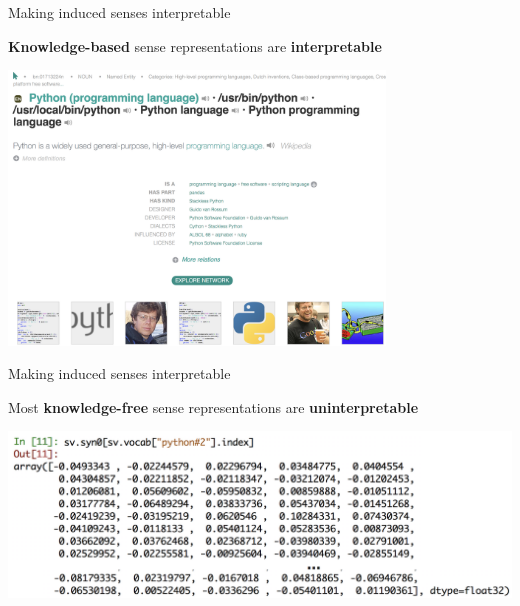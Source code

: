 \documentclass[usenames,dvipsnames]{beamer}
\begin{document}
\begin{frame}{ Making induced senses interpretable }

\vspace{-1em}

\textbf{Knowledge-based} sense representations are \alert{\textbf{interpretable}}
	\begin{center}
	\includegraphics[width=0.75\textwidth]{babelnet}
	\end{center}


\end{frame}


\begin{frame}{ Making induced senses interpretable }

\vspace{-1em}
Most \textbf{knowledge-free} sense representations are 
\alert{\textbf{uninterpretable}}

	\begin{center}
	\includegraphics[width=1.\textwidth]{numpy}
	\end{center}	

\end{frame}
\end{document}
